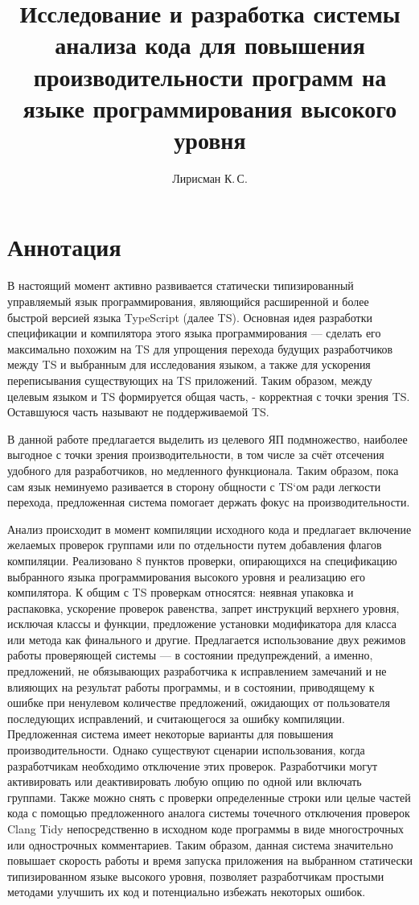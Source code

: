 \documentclass{mipt-thesis-bs}
\title{Исследование и разработка системы анализа кода для повышения производительности программ на языке программирования высокого уровня}
\author{Лирисман К.\,С.}
\begin{document}
\frontmatter
\titlecontents

\chapter{Аннотация}

В настоящий момент активно развивается статически типизированный управляемый язык
программирования, являющийся расширенной и более быстрой версией языка TypeScript (далее TS).
Основная идея разработки спецификации и компилятора этого языка программирования — сделать его максимально 
похожим на TS для упрощения перехода будущих разработчиков между TS и
выбранным для исследования языком, а также для ускорения переписывания существующих на TS приложений.
Таким образом, между целевым языком и TS формируется общая часть, - корректная с точки зрения TS. 
Оставшуюся часть называют не поддерживаемой TS.

В данной работе предлагается выделить из целевого ЯП подмножество, наиболее выгодное с точки зрения производительности, 
в том числе за счёт отсечения удобного для разработчиков, но медленного функционала. Таким образом, пока сам язык неминуемо 
разивается в сторону общности с TS`ом ради легкости перехода, предложенная система помогает держать фокус 
на производительности.

Анализ происходит в момент компиляции исходного кода и предлагает включение желаемых
проверок группами или по отдельности путем добавления флагов компиляции. Реализовано 
8 пунктов проверки, опирающихся на спецификацию выбранного языка
программирования высокого уровня и реализацию его компилятора. К общим с TS проверкам относятся: 
неявная упаковка и распаковка, ускорение проверок равенства, запрет инструкций верхнего уровня, исключая 
классы и функции, предложение установки модификатора для класса или метода как
финального и другие.
Предлагается использование двух режимов работы проверяющей системы — в состоянии
предупреждений, а именно, предложений, не обязывающих разработчика к исправлением замечаний и не
влияющих на результат работы программы, и в состоянии, приводящему к ошибке при ненулевом количестве 
предложений, ожидающих от пользователя последующих исправлений, и считающегося за
ошибку компиляции.
Предложенная система имеет некоторые варианты для повышения производительности. Однако
существуют сценарии использования, когда разработчикам необходимо отключение этих проверок. 
Разработчики могут активировать или деактивировать любую опцию по одной или включать группами.
Также можно снять с проверки определенные строки или целые частей кода с помощью
предложенного аналога системы точечного отключения проверок Clang Tidy непосредственно
в исходном коде программы в виде многострочных или однострочных комментариев.
Таким образом, данная система значительно повышает скорость работы и время запуска
приложения на выбранном статически типизированном языке высокого уровня, позволяет разработчикам 
простыми методами улучшить их код и потенциально избежать некоторых ошибок.
\end{document}
